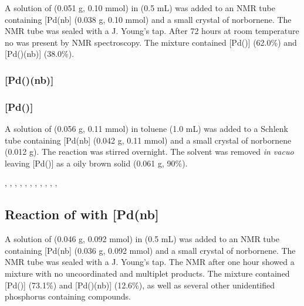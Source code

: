 A solution of \tButhixantphos{} (0.051 g, 0.10 mmol) in  (0.5 mL) was added to an NMR tube containing [Pd(nb] (0.038 g, 0.10 mmol) and a small crystal of norbornene.  The NMR tube was sealed with a J. Young's tap.  After 72 hours at room temperature no \tButhixantphos{} was present by \phosphorus{} NMR spectroscopy.  The mixture contained [Pd(\tButhixantphos)] (62.0\%) and [Pd(\tButhixantphos)(nb)] (38.0\%).  

\subsubsection{[Pd(\tButhixantphos)(nb)]}


\subsubsection{[Pd(\tButhixantphos)]}


A solution of \tButhixantphos{} (0.056 g, 0.11 mmol) in toluene (1.0 mL) was added to a Schlenk tube containing [Pd(nb] (0.042 g, 0.11 mmol) and a small crystal of norbornene (0.012 g).  The reaction was stirred overnight.  The solvent was removed \emph{in vacuo} leaving [Pd(\tButhixantphos)] as a oily brown solid (0.061 g, 90\%).

,
,
,
,
,
,
,
,
,
,
,

\subsection*{Reaction of \tBuxantphos{} with [Pd(nb]}

A solution of \tBuxantphos{} (0.046 g, 0.092 mmol) in  (0.5 mL) was added to an NMR tube containing [Pd(nb] (0.036 g, 0.092 mmol) and a small crystal of norbornene.  The NMR tube was sealed with a J. Young's tap.  The NMR after one hour showed a mixture with no uncoordinated \tBuxantphos{} and multiplet products.  The mixture contained [Pd(\tBuxantphos)] (73.1\%) and [Pd(\tBuxantphos)(nb)] (12.6\%), as well as several other unidentified phosphorus containing compounds.  


